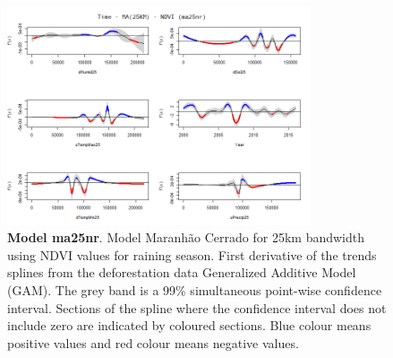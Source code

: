 \begin{table}


\begin{figure}[H]
 \centering
        \centering
        \includegraphics[width=0.8\textwidth]{ma25nr.png} %
        \caption[Model Cerrado Maranhão for 25km bandwidth using NDVI values for raining season. First derivative of the trends splines from the deforestation data Generalized Additive Model (GAM)]{\textbf{Model ma25nr}. Model Maranhão Cerrado for 25km bandwidth using NDVI values for raining season. First derivative of the trends splines from the deforestation data Generalized Additive Model (GAM). The grey band is a 99\% simultaneous point-wise confidence interval. Sections of the spline where the confidence interval does not include zero are indicated by coloured sections. Blue colour means positive values and red colour means negative values.}
\end{figure}
\end{table}

